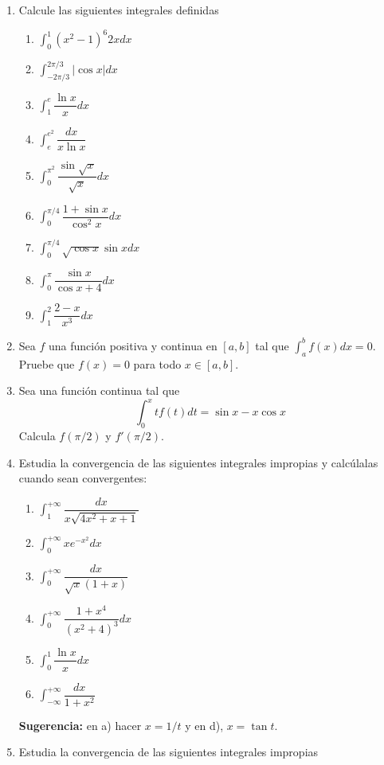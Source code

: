 \documentclass[10pt,twoside]{SelfArx} %
\begin{document}
\begin{enumerate}
    \item Calcule las siguientes integrales definidas
	    \begin{enumerate}
	    	\item $ \displaystyle\int_{0}^{1}(x^{2}-1)^{6}2xdx $
	    	\item $ \displaystyle\int_{-2\pi/3}^{2\pi/3}|\cos x|dx $
	    	\item $ \displaystyle\int_{1}^{e}\dfrac{\ln x}{x}dx $
	    	\item $ \displaystyle\int_{e}^{e^{2}}\dfrac{dx}{x\ln x} $
	    	\item $ \displaystyle\int_{0}^{\pi^{2}}\dfrac{\sin \sqrt{x}}{\sqrt{x}}dx $
	    	\item $ \displaystyle\int_{0}^{\pi/4}\dfrac{1+\sin x}{\cos^{2} x}dx $
	    	\item $ \displaystyle\int_{0}^{\pi/4}\sqrt{\cos x}\sin xdx $
	    	\item $ \displaystyle\int_{0}^{\pi}\dfrac{\sin x}{\cos x+4}dx $
	    	\item $ \displaystyle\int_{1}^{2}\dfrac{2-x}{x^{3}}dx $
	    \end{enumerate}
	  \item  Sea $ f $ una función positiva y continua en $ [a,b] $ tal que $ \displaystyle\int_{a}^{b}f(x)dx=0 $. Pruebe que $ f(x)=0 $ para todo $ x\in [a,b] $.
	  \item Sea una función continua tal que 
	  \[ \int_{0}^{x}tf(t)dt=\sin x-x\cos x \]
	  Calcula $ f(\pi/2) $ y $ f'(\pi/2) $.
	  \item Estudia la convergencia de las siguientes integrales impropias y calcúlalas cuando sean convergentes:
	  \begin{enumerate}
	  	\item $ \displaystyle\int_{1}^{+\infty}\dfrac{dx}{x\sqrt{4x^{2}+x+1}} $
	  	\item $ \displaystyle\int_{0}^{+\infty}xe^{-x^{2}}dx $
	  	\item $ \displaystyle\int_{0}^{+\infty}\dfrac{dx}{\sqrt{x}(1+x)} $
	  	\item $ \displaystyle\int_{0}^{+\infty}\dfrac{1+x^{4}}{(x^{2}+4)^{3}}dx $
	  	\item $ \displaystyle\int_{0}^{1}\dfrac{\ln x}{x}dx $
	  	\item $ \displaystyle\int_{-\infty}^{+\infty}\dfrac{dx}{1+x^{2}} $
	  \end{enumerate}
	\textbf{  Sugerencia:} en a) hacer $ x=1/t $ y en d), $ x=\tan t $.
	\item Estudia la convergencia de las siguientes integrales impropias

\end{enumerate}
\end{document}
